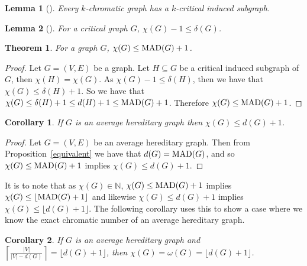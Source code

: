 \documentclass{article}
\newtheorem{corollary}{Corollary}
\newcommand{\MAD}{\ensuremath{\text{\textit{MAD}}}}
\newtheorem{theorem}{Theorem}
\newtheorem{lemma}{Lemma}
\begin{document}
\begin{lemma}[\cite{2}]
    Every $k$-chromatic graph has a $k$-critical induced subgraph. 
\end{lemma}

\begin{lemma}[\cite{2}]
    For a critical graph $G$, $\chi(G) - 1 \leq \delta(G)$.  
\end{lemma}

\begin{theorem}\label{bound}
    For a graph $G$, $\chi(G) \leq \MAD(G)+1$.
\end{theorem}

\begin{proof}
    Let $G = (V,E)$ be a graph. 
    Let $H \subseteq G$ be a critical induced subgraph of $G$, then $\chi(H) = \chi(G)$. As $\chi(G) - 1 \leq \delta(H)$, then we have that $\chi(G) \leq \delta(H) + 1$. So we have that $\chi(G) \leq \delta(H) + 1 \leq d(H)+ 1 \leq \MAD(G)+ 1$. Therefore $\chi(G) \leq \MAD(G)+ 1$.
\end{proof}


\begin{corollary}\label{avgbound}
    If $G$ is an average hereditary graph then $\chi(G) \leq d(G)+1$.
\end{corollary}
\begin{proof}
    Let $G = (V,E)$ be an average hereditary graph. Then from Proposition~\ref*{equivalent} we have that $d(G) = \MAD(G)$, and so $\chi(G) \leq \MAD(G)+1$ implies $\chi(G) \leq d(G)+1$.
\end{proof}

It is to note that as $\chi(G) \in \mathbb{N}$, $\chi(G) \leq \MAD(G)+1$ implies $ \chi(G) \leq \lfloor \MAD(G)+1 \rfloor$ and likewise $\chi(G) \leq d(G)+1$ implies $ \chi(G) \leq \lfloor d(G)+1 \rfloor$.
The following corollary uses this to show a case where we know the exact chromatic number of an average hereditary graph.

\begin{corollary}\label{lowerequpper}
    If $G$ is an average hereditary graph and $\left\lceil\frac{|V|}{|V|-d(G)} \right\rceil = \lfloor d(G)+1 \rfloor$, then $\chi(G) = \omega(G) = \lfloor d(G)+1 \rfloor$.
\end{corollary}
\end{document}

